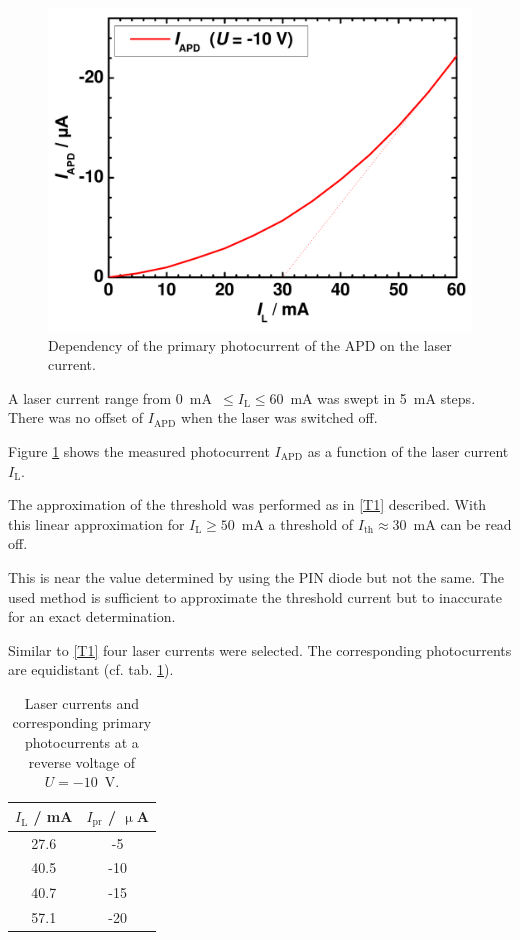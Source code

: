 \begin{figure}%
\centering
\includegraphics[width=.5\columnwidth]{Grafiken/T3_laser.pdf}%
\caption{Dependency of the primary photocurrent of the APD on the laser current.}%
\label{fig:T3_laser}%
\end{figure}


A laser current range from 0~mA~$\leq I_{\mathrm{L}} \leq 60$~mA was swept in 5~mA steps. There was no offset of $I_{\mathrm{APD}}$ when the laser was switched off. 

Figure \ref{fig:T3_laser} shows the measured photocurrent $I_{\mathrm{APD}}$ as a function of the laser current $I_{\mathrm{L}}$. 

The approximation of the threshold was performed as in \ref{T1} described.
With this linear approximation for $I_{\mathrm{L}} \geq 50$~mA a threshold of $I_{\mathrm{th}} \approx 30$~mA can be read off.

This is near the value determined by using the PIN diode but not the same. The used method is sufficient to approximate the threshold current but to inaccurate for an exact determination.   



Similar to \ref{T1} four laser currents were selected. The corresponding photocurrents are equidistant (cf. tab. \ref{tab:T3_values}).

\begin{table}%
\centering
\caption{Laser currents and corresponding primary photocurrents at a reverse voltage of $U = -10$~V.}


\begin{tabular}{cc}

\toprule
$I_{\mathrm{L}}$ / mA	&	$I_{\mathrm{pr}}$ / $\upmu$A\\

\midrule
27.6 & -5\\
40.5 & -10\\
40.7 & -15\\
57.1 & -20\\

\bottomrule 
\end{tabular}
\label{tab:T3_values}
\end{table}

